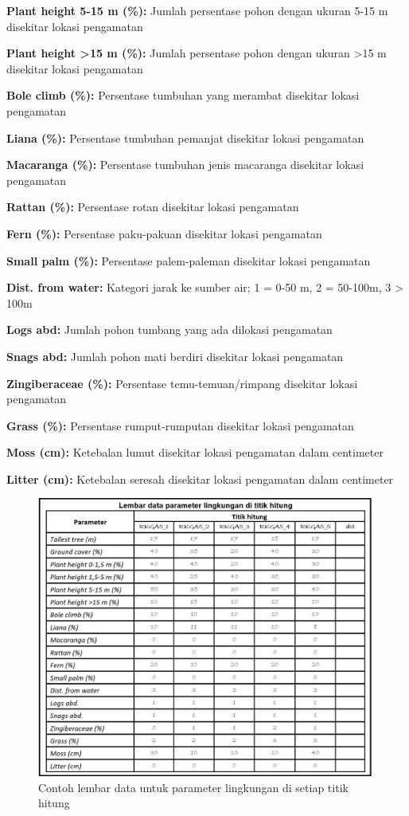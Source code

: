 \documentclass[
]{book}
\begin{document}
\textbf{Plant height 5-15 m (\%):} Jumlah persentase pohon dengan ukuran 5-15 m disekitar lokasi pengamatan

\textbf{Plant height \textgreater15 m (\%):} Jumlah persentase pohon dengan ukuran \textgreater15 m disekitar lokasi pengamatan

\textbf{Bole climb (\%):} Persentase tumbuhan yang merambat disekitar lokasi pengamatan

\textbf{Liana (\%):} Persentase tumbuhan pemanjat disekitar lokasi pengamatan

\textbf{Macaranga (\%):} Persentase tumbuhan jenis macaranga disekitar lokasi pengamatan

\textbf{Rattan (\%):} Persentase rotan disekitar lokasi pengamatan

\textbf{Fern (\%):} Persentase paku-pakuan disekitar lokasi pengamatan

\textbf{Small palm (\%):} Persentase palem-paleman disekitar lokasi pengamatan

\textbf{Dist. from water:} Kategori jarak ke sumber air; 1 = 0-50 m, 2 = 50-100m, 3 \textgreater{} 100m

\textbf{Logs abd:} Jumlah pohon tumbang yang ada dilokasi pengamatan

\textbf{Snags abd:} Jumlah pohon mati berdiri disekitar lokasi pengamatan

\textbf{Zingiberaceae (\%):} Persentase temu-temuan/rimpang disekitar lokasi pengamatan

\textbf{Grass (\%):} Persentase rumput-rumputan disekitar lokasi pengamatan

\textbf{Moss (cm):} Ketebalan lumut disekitar lokasi pengamatan dalam centimeter

\textbf{Litter (cm):} Ketebalan seresah disekitar lokasi pengamatan dalam centimeter

\begin{figure}

{\centering \includegraphics[width=1\linewidth]{images/ldp_pl} 

}

\caption{Contoh lembar data untuk parameter lingkungan di setiap titik hitung}\label{fig:ldppl}
\end{figure}
\end{document}
